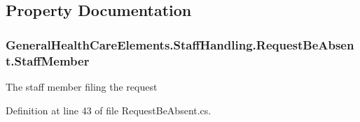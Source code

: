 \subsection{Property Documentation}
\subsubsection[{\texorpdfstring{Staff\+Member}{StaffMember}}]{ General\+Health\+Care\+Elements.\+Staff\+Handling.\+Request\+Be\+Absent.\+Staff\+Member\hspace{0.3cm}{\ttfamily [get]}}\hypertarget{class_general_health_care_elements_1_1_staff_handling_1_1_request_be_absent_a4d022ec924f2528f16506bd266f42b18}{}\label{class_general_health_care_elements_1_1_staff_handling_1_1_request_be_absent_a4d022ec924f2528f16506bd266f42b18}


The staff member filing the request 



Definition at line 43 of file Request\+Be\+Absent.\+cs.

